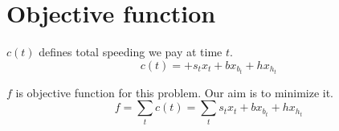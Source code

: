 \section{Objective function}

\begin{definition}{$c(t)$}
defines total speeding we pay at time $t$.
    \begin{equation}
        \label{eq:cost-t}
        c(t) = + s_t x_t + b x_{b_t} + h x_{h_t}
    \end{equation}
\end{definition}

\begin{definition}{$f$}
    is objective function for this problem. Our aim is to minimize it.
    \begin{equation}
        f =  \sum_t{c(t)} = \sum_t{s_t x_t + b x_{b_t} + h x_{h_t}}
        \label{eq:cost-f}
    \end{equation}
\end{definition}
